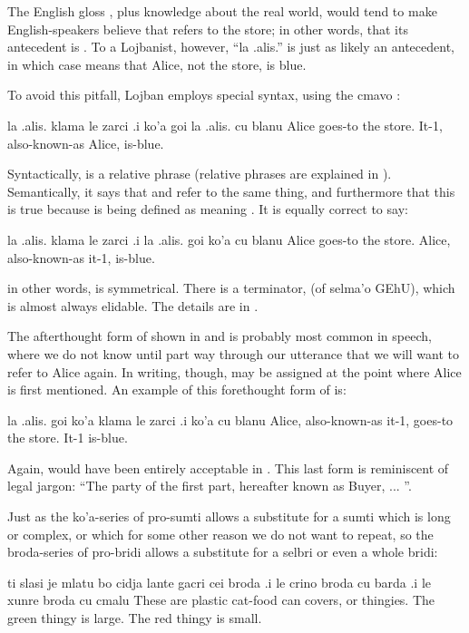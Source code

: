 The English gloss , plus knowledge about the real
    world, would tend to make English-speakers believe that
     refers to the store; in other words, that its
    antecedent is . To a Lojbanist, however, ``la
    .alis.'' is just as likely an antecedent, in which case  means that Alice, not the store,
    is blue.

To avoid this pitfall, Lojban employs special syntax, using
    the cmavo :
\begin{example}
la .alis. klama le zarci\n
\T	.i ko'a goi la .alis. cu blanu\n
Alice goes-to the store.\n
\T	It-1, also-known-as Alice, is-blue.
\end{example}

Syntactically,  is a relative phrase (relative
    phrases are explained in ).
    Semantically, it says that  and  refer to
    the same thing, and furthermore that this is true because
     is being defined as meaning . It is
    equally correct to say:
\begin{example}
la .alis. klama le zarci\n
\T	.i la .alis. goi ko'a cu blanu\n
Alice goes-to the store.\n
\T	Alice, also-known-as it-1, is-blue.
\end{example}

{\noindent}in other words,  is symmetrical. There is a terminator,
     (of selma'o GEhU), which is almost always elidable.
    The details are in . 

The afterthought form of  shown in  and  is probably most common in speech, where we do not know
    until part way through our utterance that we will want to refer
    to Alice again. In writing, though,  may be assigned at
    the point where Alice is first mentioned. An example of this
    forethought form of  is:
\begin{example}
la .alis. goi ko'a klama le zarci\n
\T	.i ko'a cu blanu\n
Alice, also-known-as it-1, goes-to the store.\n
\T	It-1 is-blue.
\end{example}

Again,  would have been entirely
    acceptable in . This last form
    is reminiscent of legal jargon: ``The party of the first part,
    hereafter known as Buyer, ... ''. 

Just as the ko'a-series of pro-sumti allows a substitute for
    a sumti which is long or complex, or which for some other
    reason we do not want to repeat, so the broda-series of
    pro-bridi allows a substitute for a selbri or even a whole
    bridi:
\begin{example}
ti slasi je mlatu bo cidja lante gacri cei broda\n
\T	.i le crino broda cu barda\n
\T	.i le xunre broda cu cmalu\n
These are plastic cat-food can covers, or thingies.\n
\T	The green thingy is large.\n
\T	The red thingy is small.
\end{example}

